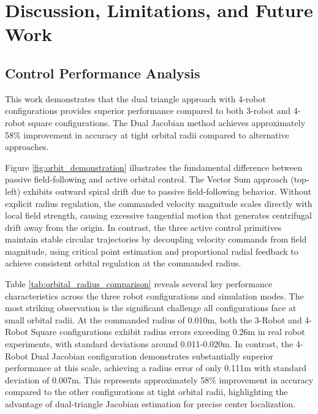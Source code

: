 \documentclass[lettersize,journal]{IEEEtran}
\begin{document}
\section{Discussion, Limitations, and Future Work}

\subsection{Control Performance Analysis}

This work demonstrates that the dual triangle approach with 4-robot configurations provides superior performance compared to both 3-robot and 4-robot square configurations. The Dual Jacobian method achieves approximately 58\% improvement in accuracy at tight orbital radii compared to alternative approaches.

Figure \ref{fig:orbit_demonstration} illustrates the fundamental difference between passive field-following and active orbital control. The Vector Sum approach (top-left) exhibits outward spiral drift due to passive field-following behavior. Without explicit radius regulation, the commanded velocity magnitude scales directly with local field strength, causing excessive tangential motion that generates centrifugal drift away from the origin. In contrast, the three active control primitives maintain stable circular trajectories by decoupling velocity commands from field magnitude, using critical point estimation and proportional radial feedback to achieve consistent orbital regulation at the commanded radius.



Table \ref{tab:orbital_radius_comparison} reveals several key performance characteristics across the three robot configurations and simulation modes. The most striking observation is the significant challenge all configurations face at small orbital radii. At the commanded radius of 0.010m, both the 3-Robot and 4-Robot Square configurations exhibit radius errors exceeding 0.26m in real robot experiments, with standard deviations around 0.011-0.020m. In contrast, the 4-Robot Dual Jacobian configuration demonstrates substantially superior performance at this scale, achieving a radius error of only 0.111m with standard deviation of 0.007m. This represents approximately 58\% improvement in accuracy compared to the other configurations at tight orbital radii, highlighting the advantage of dual-triangle Jacobian estimation for precise center localization.
\end{document}
